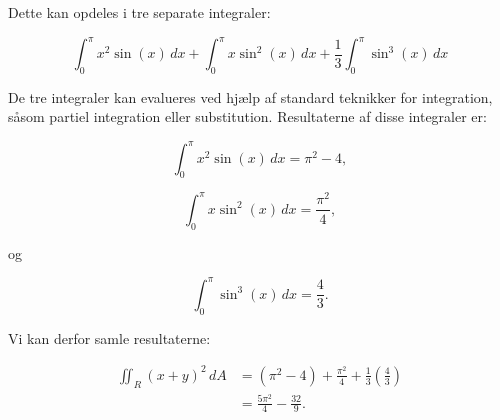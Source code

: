 \documentclass{article}
\begin{document}
Dette kan opdeles i tre separate integraler:

\begin{equation*}
    \int_0^{\pi}x^2\sin(x)\,dx
    +
    \int_0^{\pi}x\sin^2(x)\,dx
    +
    \frac{1}{3}\int_0^{\pi}\sin^3(x)\,dx
\end{equation*}

De tre integraler kan evalueres ved hjælp af standard teknikker for integration, såsom partiel integration eller substitution. Resultaterne af disse integraler er:

\begin{equation*}
    \int_0^{\pi}x^2\sin(x)\,dx = \pi^2-4,
\end{equation*}

\begin{equation*}
    \int_0^{\pi}x\sin^2(x)\,dx = \frac{\pi^2}{4},
\end{equation*}

og

\begin{equation*}
    \int_0^{\pi}\sin^3(x)\,dx = \frac{4}{3}.
\end{equation*}

Vi kan derfor samle resultaterne:

\begin{equation*}
    \begin{aligned}
    \iint_R (x+y)^2\,dA
    &= (\pi^2-4)
    +\frac{\pi^2}{4}
    +\frac{1}{3}\left(\frac{4}{3}\right)\\
    &= \boxed{\frac{5\pi^2}{4}-\frac{32}{9}}.
    \end{aligned}
\end{equation*}
\end{document}
